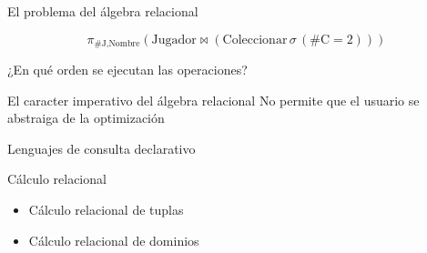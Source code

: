 \begin{frame}{El problema del \'algebra relacional}

   
    $$ \pi_{\text{\#J}, \text{Nombre}}(\text{Jugador} \Join (\text{Coleccionar}\,\sigma\,(\text{\#C}=2))) $$

    \begin{block}{¿En qu\'e orden se ejecutan las operaciones?}

    \end{block}
         
    
\end{frame}


\begin{frame}{El caracter imperativo del \'algebra relacional}
    \centering
    \Large No permite que el usuario se abstraiga de la optimizaci\'on

\end{frame}

\begin{frame}{Lenguajes de consulta declarativo}

    \begin{block}{C\'alculo relacional}
        \begin{itemize}
            \item C\'alculo relacional de tuplas
            \item C\'alculo relacional de dominios
        \end{itemize}
    \end{block}

\end{frame}


